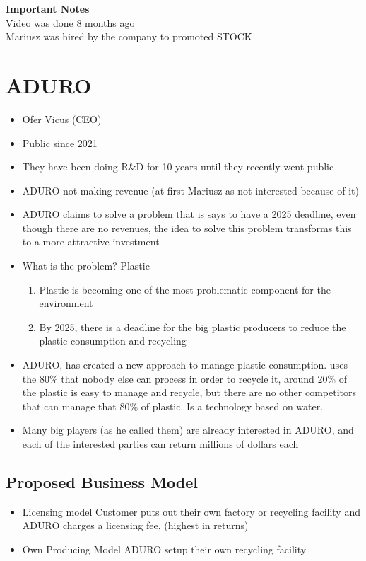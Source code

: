 \documentclass{article}
\begin{document}
\setlength\parindent{0pt}

\textbf{Important Notes}\\
Video was done 8 months ago\\
Mariusz was hired by the company to promoted STOCK

\section{ADURO}

\begin{itemize}
  \item Ofer Vicus (CEO)
  \item Public since 2021
  \item They have been doing R\&D for 10 years until they recently went public
  \item ADURO not making revenue (at first Mariusz as not interested because of it)

  \item ADURO claims to solve a problem that is says to have a 2025 deadline,
    even though there are no revenues, the idea to solve this problem transforms
    this to a more attractive investment

  \item What is the problem? Plastic 
    \begin{enumerate}
      \item Plastic is becoming one of the most problematic component for the
        environment
      \item By 2025, there is a deadline for the big plastic producers to reduce
        the plastic consumption and recycling 
    \end{enumerate}
  \item ADURO, has created a new approach to manage plastic consumption. 
    uses the 80\% that nobody else can process in order to recycle it, around 20\% of the
    plastic is easy to manage and recycle, but there are no other competitors
    that can manage that 80\% of plastic. Is a technology based on water.
  \item Many big players (as he called them) are already interested in ADURO,
    and each of the interested parties can return millions of dollars each
\end{itemize}

\subsection{Proposed Business Model}
\begin{itemize}
  \item Licensing model
    Customer puts out their own factory or recycling facility and ADURO charges a licensing fee, (highest in returns)
  \item Own Producing Model
    ADURO setup their own recycling facility 
\end{itemize}
\end{document}
